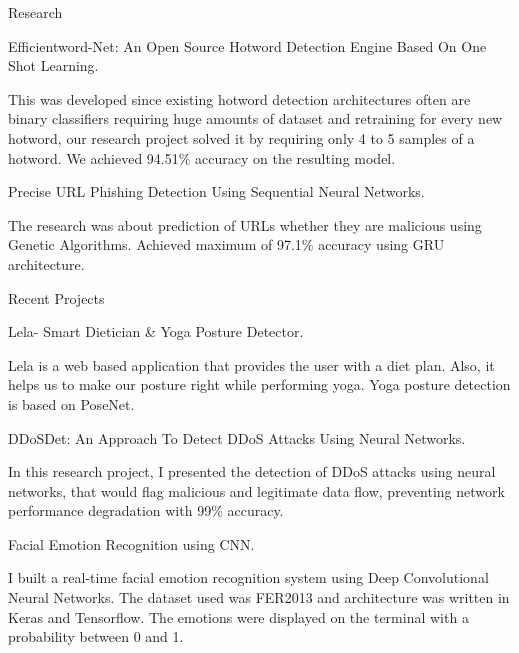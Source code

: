 \documentclass{resume} %
\begin{document}
\begin{rSection}{Research}

\begin{rSubsection}{Efficientword-Net: An Open Source Hotword Detection Engine Based On One Shot Learning.}{}{}
\item This was developed since existing hotword detection architectures often are binary classifiers requiring huge amounts of dataset and retraining for every new hotword, our research project solved it by requiring only 4 to 5 samples of a hotword. We achieved 94.51\% accuracy on the resulting model.
\end{rSubsection}


\begin{rSubsection}{Precise URL Phishing Detection Using Sequential Neural Networks.}{}{}
\item The research was about prediction of URLs whether they are malicious using Genetic Algorithms. Achieved maximum of 97.1\% accuracy using GRU architecture.
\end{rSubsection}


\end{rSection}


\begin{rSection}{Recent Projects}

\begin{rSubsection}{Lela- Smart Dietician \& Yoga Posture Detector.}{}{}
\item Lela is a web based application that provides the user with a diet plan. Also, it helps us to make our posture right while performing yoga. Yoga posture detection is based on PoseNet.
\end{rSubsection}


\begin{rSubsection}{DDoSDet: An Approach To Detect DDoS Attacks Using Neural Networks.}{}{}
\item In this research project, I presented the detection of DDoS attacks using neural networks, that would flag malicious and legitimate data flow, preventing network performance degradation with 99\% accuracy.
\end{rSubsection}


\begin{rSubsection}{Facial Emotion Recognition using CNN.}{}{}
\item I built a real-time facial emotion recognition system using Deep Convolutional Neural Networks. The dataset used was FER2013 and architecture was written in Keras and Tensorflow. The emotions were displayed on the terminal with a probability between 0 and 1. 

\end{rSubsection}

\end{rSection}
\end{document}
